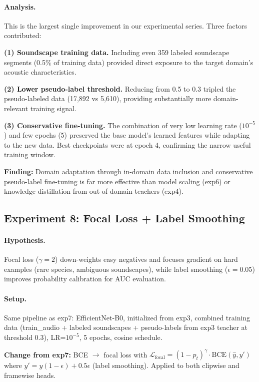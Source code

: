 \paragraph{Analysis.}
This is the largest single improvement in our experimental series.
Three factors contributed:

\textbf{(1) Soundscape training data.}
Including even 359 labeled soundscape segments (0.5\% of training data)
provided direct exposure to the target domain's acoustic characteristics.

\textbf{(2) Lower pseudo-label threshold.}
Reducing from 0.5 to 0.3 tripled the pseudo-labeled data (17,892 vs 5,610),
providing substantially more domain-relevant training signal.

\textbf{(3) Conservative fine-tuning.}
The combination of very low learning rate ($10^{-5}$) and few epochs (5)
preserved the base model's learned features while adapting to the new data.
Best checkpoints were at epoch 4, confirming the narrow useful training window.

\textbf{Finding:} Domain adaptation through in-domain data inclusion and
conservative pseudo-label fine-tuning is far more effective than model scaling
(exp6) or knowledge distillation from out-of-domain teachers (exp4).

\subsection{Experiment 8: Focal Loss + Label Smoothing}
\label{sec:exp8}

\paragraph{Hypothesis.}
Focal loss ($\gamma=2$) down-weights easy negatives and focuses gradient on
hard examples (rare species, ambiguous soundscapes), while label smoothing
($\epsilon=0.05$) improves probability calibration for AUC evaluation.

\paragraph{Setup.}
Same pipeline as exp7: EfficientNet-B0, initialized from exp3, combined
training data (train\_audio + labeled soundscapes + pseudo-labels from exp3
teacher at threshold 0.3), LR=$10^{-5}$, 5 epochs, cosine schedule.

\textbf{Change from exp7:} BCE $\to$ focal loss with
$\mathcal{L}_\text{focal} = (1-p_t)^\gamma \cdot \text{BCE}(\hat{y}, y')$
where $y' = y(1-\epsilon) + 0.5\epsilon$ (label smoothing).
Applied to both clipwise and framewise heads.

